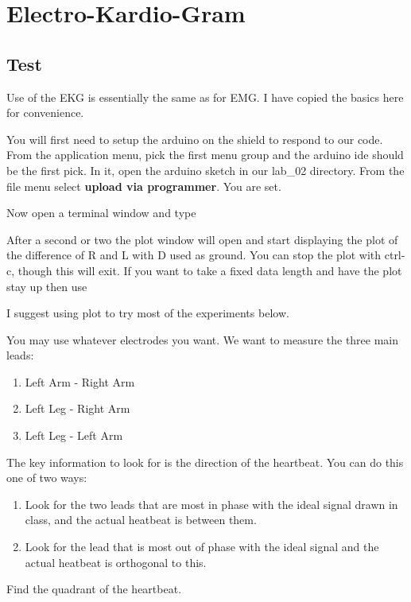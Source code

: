 \chapter{Electro-Kardio-Gram}

\section{Test}

Use of the EKG is essentially the same as for EMG.  I have copied the basics here for convenience.

You will first need to setup the arduino on the shield to respond to our code.  From the application menu, pick the first menu group and the arduino ide should be the first pick.  In it, open the arduino sketch in our lab\_02 directory.  From the file menu select \textbf{upload via programmer}.  You are set.

Now open a terminal window and type



After a second or two the plot window will open and start displaying the plot of the difference of R and L with D used as ground.  You can stop the plot with ctrl-c, though this will exit.  If you want to take a fixed data length and have the plot stay up then use


I suggest using plot to try most of the experiments below.

You may use whatever electrodes you want.  We want to measure the three main leads:
\begin{enumerate}
\item Left Arm - Right Arm
\item Left Leg - Right Arm
\item Left Leg - Left Arm
\end{enumerate}
The key information to look for is the direction of the heartbeat.  You can do this one of two ways:
\begin{enumerate}
\item Look for the two leads that are most in phase with the ideal signal drawn in class, and the actual heatbeat is between them.
\item Look for the lead that is most out of phase with the ideal signal and the actual heatbeat is orthogonal to this.
\end{enumerate}
Find the quadrant of the heartbeat.


